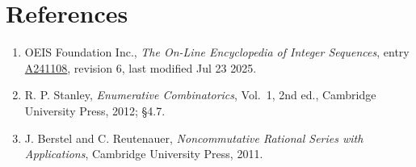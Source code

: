 \documentclass[11pt]{article}
\theoremstyle{definition}
\begin{document}
\section{References}

\begin{enumerate}

\item OEIS Foundation Inc., \emph{The On-Line Encyclopedia of Integer Sequences}, entry \href{https://oeis.org/A241108}{A241108}, revision 6, last modified Jul 23 2025.

\item R. P. Stanley, \emph{Enumerative Combinatorics}, Vol.~1, 2nd ed., Cambridge University Press, 2012; \S4.7.

\item J. Berstel and C. Reutenauer, \emph{Noncommutative Rational Series with Applications}, Cambridge University Press, 2011.

\end{enumerate}
\end{document}
